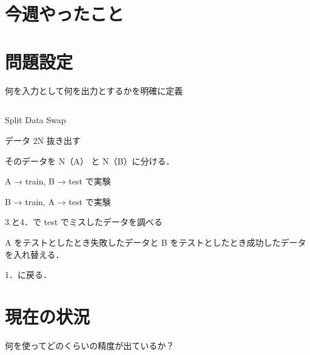 \documentclass[twocolumn]{jarticle}     %
\begin{document}


\section{今週やったこと}


\section{問題設定}
何を入力として何を出力とするかを明確に定義

	\subsection{}
	\subsubsection{}

		\begin{algorithm}
			\caption{Split Data Swap}
			\label{alg1}
			\begin{enumerate}{ %
				\item{データ 2N 抜き出す}
				\item{そのデータを N（A） と N（B）に分ける．}
				\item{A → train, B → test で実験}
				\item{B → train, A → test で実験}
				\item{3.と4．で test でミスしたデータを調べる}
				\item{A をテストとしたとき失敗したデータと B をテストとしたとき成功したデータを入れ替える．}
				\item{1．に戻る．}
			}\end{enumerate}
		\end{algorithm}


\section{現在の状況}
何を使ってどのくらいの精度が出ているか？
\end{document}
